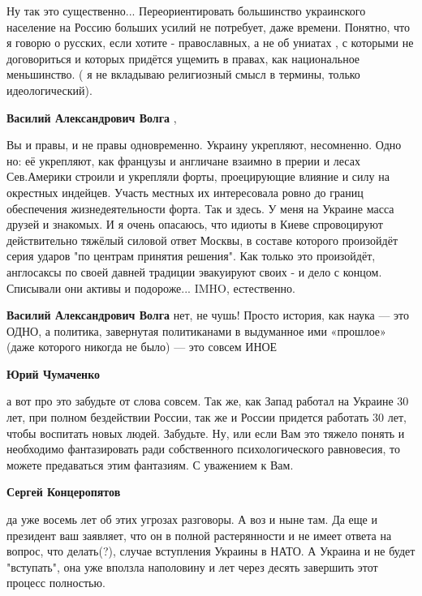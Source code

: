 \begin{itemize}
\begin{itemize}

Ну так это существенно... Переориентировать большинство украинского население
на Россию больших усилий не потребует, даже времени. Понятно, что я говорю о
русских, если хотите - православных, а не об униатах , с которыми не
договориться и которых придётся ущемить в правах, как национальное меньшинство.
( я не вкладываю религиозный смысл в термины, только идеологический).


\textbf{Василий Александрович Волга} , 

Вы и правы, и не правы одновременно. Украину укрепляют, несомненно. Одно но: её
укрепляют, как французы и англичане взаимно в прерии и лесах Сев.Америки
строили и укрепляли форты, проецирующие влияние и силу на окрестных индейцев.
Участь местных их интересовала ровно до границ обеспечения жизнедеятельности
форта. Так и здесь. У меня на Украине масса друзей и знакомых. И я очень
опасаюсь, что идиоты в Киеве спровоцируют действительно тяжёлый силовой ответ
Москвы, в составе которого произойдёт серия ударов "по центрам принятия
решения". Как только это произойдёт, англосаксы по своей давней традиции
эвакуируют своих - и дело с концом. Списывали они активы и подороже... IMHO,
естественно.

\textbf{Василий Александрович Волга} нет, не чушь! Просто история, как наука — это ОДНО, а политика, завернутая политиканами в выдуманное ими «прошлое» (даже которого никогда не было) — это совсем ИНОЕ

\textbf{Юрий Чумаченко} 

а вот про это забудьте от слова совсем. Так же, как Запад работал на Украине 30
лет, при полном бездействии России, так же и России придется работать 30 лет,
чтобы воспитать новых людей. Забудьте. Ну, или если Вам это тяжело понять и
необходимо фантазировать ради собственного психологического равновесия, то
можете предаваться этим фантазиям. С уважением к Вам.

\textbf{Сергей Концеропятов} 

да уже восемь лет об этих угрозах разговоры. А воз и ныне там. Да еще и
президент ваш заявляет, что он в полной растерянности и не имеет ответа на
вопрос, что делать(?), случае вступления Украины в НАТО. А Украина и не будет
"вступать", она уже вползла наполовину и лет через десять завершить этот
процесс полностью.



\end{itemize}
\end{itemize}

